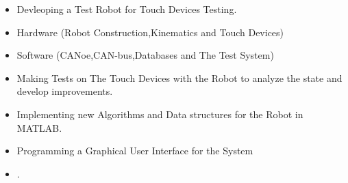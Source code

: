 \documentclass[10pt,a4paper,ragged2e]{altacv}
\begin{document}
\begin{itemize}
\item Devleoping a Test Robot for Touch Devices Testing. 
\item Hardware (Robot Construction,Kinematics and Touch Devices)
\item Software (CANoe,CAN-bus,Databases and The Test System)
\item Making Tests on The Touch Devices with the Robot to analyze the state
and develop improvements.
\item  Implementing new Algorithms and Data structures for the Robot in MATLAB.
\item Programming a Graphical User Interface for the System
\item {}.
\end{itemize}
\divider
\end{document}
